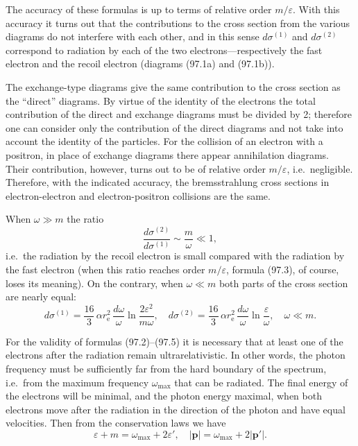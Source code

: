 The accuracy of these formulas is up to terms of relative order $m/\varepsilon$. With this accuracy it turns out that the contributions to the cross section from the various diagrams do not interfere with each other, and in this sense $d\sigma^{(1)}$ and $d\sigma^{(2)}$ correspond to radiation by each of the two electrons---respectively the fast electron and the recoil electron (diagrams (97.1a) and (97.1b)).

The exchange-type diagrams give the same contribution to the cross section as the ``direct'' diagrams. By virtue of the identity of the electrons the total contribution of the direct and exchange diagrams must be divided by 2; therefore one can consider only the contribution of the direct diagrams and not take into account the identity of the particles. For the collision of an electron with a positron, in place of exchange diagrams there appear annihilation diagrams. Their contribution, however, turns out to be of relative order $m/\varepsilon$, i.e.\ negligible. Therefore, with the indicated accuracy, the bremsstrahlung cross sections in electron-electron and electron-positron collisions are the same.

When $\omega \gg m$ the ratio
\[
\frac{d\sigma^{(2)}}{d\sigma^{(1)}} \sim \frac{m}{\omega} \ll 1,
\]
i.e.\ the radiation by the recoil electron is small compared with the radiation by the fast electron (when this ratio reaches order $m/\varepsilon$, formula (97.3), of course, loses its meaning). On the contrary, when $\omega \ll m$ both parts of the cross section are nearly equal:
\begin{equation}
d\sigma^{(1)} = \frac{16}{3}\,\alpha r_\mathrm{e}^2\,\frac{d\omega}{\omega}\ln\frac{2\varepsilon^2}{m\omega}, \quad d\sigma^{(2)} = \frac{16}{3}\,\alpha r_\mathrm{e}^2\,\frac{d\omega}{\omega}\ln\frac{\varepsilon}{\omega}, \quad \omega \ll m.
\label{eq:97.5}
\end{equation}

For the validity of formulas (97.2)--(97.5) it is necessary that at least one of the electrons after the radiation remain ultrarelativistic. In other words, the photon frequency must be sufficiently far from the hard boundary of the spectrum, i.e.\ from the maximum frequency $\omega_\text{max}$ that can be radiated. The final energy of the electrons will be minimal, and the photon energy maximal, when both electrons move after the radiation in the direction of the photon and have equal velocities. Then from the conservation laws we have
\[
\varepsilon + m = \omega_\text{max} + 2\varepsilon', \quad |\mathbf{p}| = \omega_\text{max} + 2|\mathbf{p}'|.
\]


